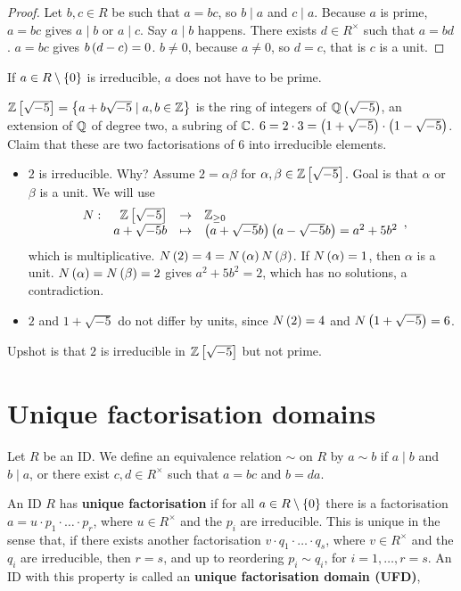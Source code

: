 \begin{proof}
Let $ b, c \in R $ be such that $ a = bc $, so $ b \mid a $ and $ c \mid a $. Because $ a $ is prime, $ a = bc $ gives $ a \mid b $ or $ a \mid c $. Say $ a \mid b $ happens. There exists $ d \in R^\times $ such that $ a = bd $. $ a = bc $ gives $ b\left( d - c \right) = 0 $. $ b \ne 0 $, because $ a \ne 0 $, so $ d = c $, that is $ c $ is a unit.
\end{proof}

\begin{remark1}
If $ a \in R \setminus \left\{ 0 \right\} $ is irreducible, $ a $ does not have to be prime.
\end{remark1}

\begin{example1}
$ \mathbb{Z}\left[ \sqrt{-5} \right] = \left\{ a + b\sqrt{-5} \mid a, b \in \mathbb{Z} \right\} $ is the ring of integers of $ \mathbb{Q}\left( \sqrt{-5} \right) $, an extension of $ \mathbb{Q} $ of degree two, a subring of $ \mathbb{C} $. $ 6 = 2 \cdot 3 = \left( 1 + \sqrt{-5} \right) \cdot \left( 1 - \sqrt{-5} \right) $. Claim that these are two factorisations of $ 6 $ into irreducible elements.
\begin{itemize}
\item $ 2 $ is irreducible. Why? Assume $ 2 = \alpha\beta $ for $ \alpha, \beta \in \mathbb{Z}\left[ \sqrt{-5} \right] $. Goal is that $ \alpha $ or $ \beta $ is a unit. We will use
$$ \function[N]{\Z\sb{\sqrt{-5}}}{\Z_{\ge 0}}{a + \sqrt{-5}b}{\rb{a + \sqrt{-5}b}\rb{a - \sqrt{-5}b} = a^2 + 5b^2}, $$
which is multiplicative. $ N\left( 2 \right) = 4 = N\left( \alpha \right)N\left( \beta \right) $. If $ N\left( \alpha \right) = 1 $, then $ \alpha $ is a unit. $ N\left( \alpha \right) = N\left( \beta \right) = 2 $ gives $ a^2 + 5b^2 = 2 $, which has no solutions, a contradiction.
\item $ 2 $ and $ 1 + \sqrt{-5} $ do not differ by units, since $ N\left( 2 \right) = 4 $ and $ N\left( 1 + \sqrt{-5} \right) = 6 $.
\end{itemize}
Upshot is that $ 2 $ is irreducible in $ \mathbb{Z}\left[ \sqrt{-5} \right] $ but not prime.
\end{example1}

\section{Unique factorisation domains}

Let $ R $ be an ID. We define an equivalence relation $ \sim $ on $ R $ by $ a \sim b $ if $ a \mid b $ and $ b \mid a $, or there exist $ c, d \in R^\times $ such that $ a = bc $ and $ b = da $.

\begin{definition}
An ID $ R $ has \textbf{unique factorisation} if for all $ a \in R \setminus \left\{ 0 \right\} $ there is a factorisation $ a = u \cdot p_1 \cdot \dots \cdot p_r $, where $ u \in R^\times $ and the $ p_i $ are irreducible. This is unique in the sense that, if there exists another factorisation $ v \cdot q_1 \cdot \dots \cdot q_s $, where $ v \in R^\times $ and the $ q_i $ are irreducible, then $ r = s $, and up to reordering $ p_i \sim q_i $, for $ i = 1, \dots, r = s $. An ID with this property is called an \textbf{unique factorisation domain (UFD)},
\end{definition}


